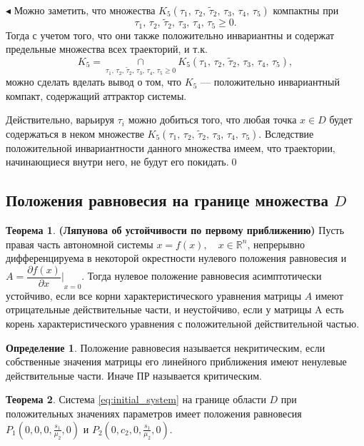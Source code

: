 \documentclass[12pt,a4paper]{extarticle}
\renewenvironment{proof}{\noindent$\blacktriangleleft$}{}
\theoremstyle{definition}
\newtheorem{theorem}{Теорема}
\theoremstyle{definition}
\newtheorem{definition}{Определение}
\theoremstyle{definition}
\begin{document}
\begin{proof}
		Можно заметить, что множества $K_5(\tau_1,\,\tau_2,\,\tilde{\tau}_2,\,\tau_3,\,\tau_4,\,\tau_5)$ компактны при
		\[\tau_1,\,\tau_2,\,\tilde{\tau}_2,\,\tau_3,\,\tau_4,\,\tau_5 \ge 0.\]
		Тогда с учетом того, что они также положительно инвариантны и содержат предельные множества всех траекторий, и т.к.
		\[K_5=\mathop{\cap}\limits_{\tau_1,\,\tau_2,\,\tilde{\tau}_2,\,\tau_3,\,\tau_4,\,\tau_5 \ge 0}K_5(\tau_1,\,\tau_2,\,\tilde{\tau}_2,\,\tau_3,\,\tau_4,\,\tau_5),\]
		можно сделать вделать вывод о том, что $K_5$ --- положительно инвариантный компакт, содержащий аттрактор системы.
		
		Действительно, варьируя $\tau_i$ можно добиться того, что любая точка $x\in D$ будет содержаться в неком множестве $K_5(\tau_1,\,\tau_2,\,\tilde{\tau}_2,\,\tau_3,\,\tau_4,\,\tau_5)$. Вследствие положительной инвариантности данного множества имеем, что траектории, начинающиеся внутри него, не будут его покидать.\qed
	\end{proof}		
	
	\subsection{Положения равновесия на границе множества $D$}
	
	\begin{theorem}\textbf{(Ляпунова об устойчивости по первому приближению)}
		Пусть правая часть автономной системы $x =f(x),\quad x\in\mathbb{R}^n$, непрерывно дифференцируема в некоторой окрестности нулевого положения равновесия и $A = {\dfrac{\partial f(x)}{\partial x}\biggr\rvert}_{x=0}$. Тогда нулевое положение равновесия асимптотически устойчиво, если все корни характеристического уравнения матрицы $A$ имеют отрицательные действительные части, и неустойчиво, если у матрицы A есть корень характеристического уравнения с положительной действительной частью.
	\end{theorem}
	
	\begin{definition}
		Положение равновесия называется некритическим, если собственные значения матрицы его линейного приближения имеют ненулевые действительные части. Иначе ПР называется критическим. 
	\end{definition}
	
	\begin{theorem}
		Система \ref{eq:initial_system} на границе области $D$ при положительных значениях параметров имеет положения равновесия $P_1\left(0,0,0,\frac{s_1}{\mu_2},0\right)$ и $P_2\left(0,c_2,0,\frac{s_1}{\mu_2},0\right)$. 
	\end{theorem}
	
\end{document}
